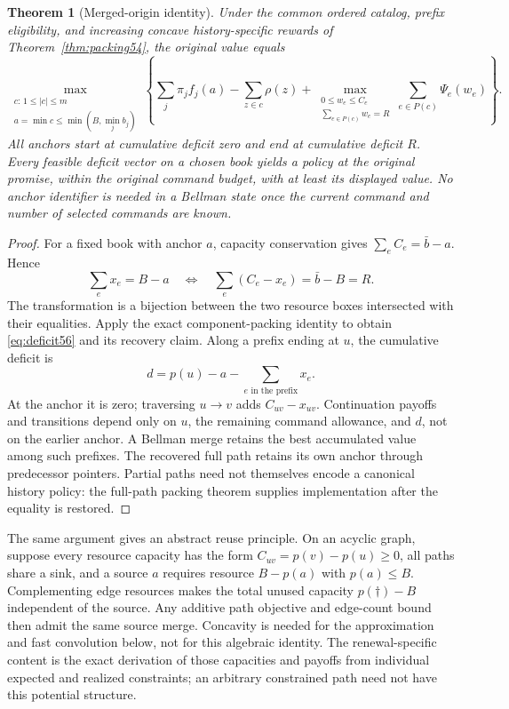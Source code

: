 \documentclass[11pt,letterpaper]{article}
\newtheorem{theorem}{Theorem}[section]
\theoremstyle{definition}\newtheorem{remark}[theorem]{Remark}
\begin{document}
\begin{theorem}[Merged-origin identity]\label{thm:deficit56}
Under the common ordered catalog, prefix eligibility, and increasing concave history-specific rewards of Theorem~\ref{thm:packing54}, the original value equals
\begin{equation}\label{eq:deficit56}
 \max_{\substack{c:\,1\leq |c|\leq m\\a=\min c\leq\min(B,\min_j b_j)}}
 \left\{\sum_j\pi_j f_j(a)-\sum_{z\in c}\rho(z)
 +\max_{\substack{0\leq w_e\leq C_e\\\sum_{e\in P(c)}w_e=R}}
           \sum_{e\in P(c)}\Psi_e(w_e)\right\}.
\end{equation}
All anchors start at cumulative deficit zero and end at cumulative deficit $R$. Every feasible deficit vector on a chosen book yields a policy at the original promise, within the original command budget, with at least its displayed value. No anchor identifier is needed in a Bellman state once the current command and number of selected commands are known.
\end{theorem}
\begin{proof}
For a fixed book with anchor $a$, capacity conservation gives $\sum_e C_e=\bar b-a$. Hence
\[
 \sum_e x_e=B-a\quad\Longleftrightarrow\quad
 \sum_e(C_e-x_e)=\bar b-B=R.
\]
The transformation is a bijection between the two resource boxes intersected with their equalities. Apply the exact component-packing identity to obtain \eqref{eq:deficit56} and its recovery claim. Along a prefix ending at $u$, the cumulative deficit is
\[
 d=p(u)-a-\sum_{e\text{ in the prefix}}x_e.
\]
At the anchor it is zero; traversing $u\to v$ adds $C_{uv}-x_{uv}$. Continuation payoffs and transitions depend only on $u$, the remaining command allowance, and $d$, not on the earlier anchor. A Bellman merge retains the best accumulated value among such prefixes. The recovered full path retains its own anchor through predecessor pointers. Partial paths need not themselves encode a canonical history policy: the full-path packing theorem supplies implementation after the equality is restored.
\end{proof}

The same argument gives an abstract reuse principle. On an acyclic graph, suppose every resource capacity has the form $C_{uv}=p(v)-p(u)\geq0$, all paths share a sink, and a source $a$ requires resource $B-p(a)$ with $p(a)\leq B$. Complementing edge resources makes the total unused capacity $p(\dagger)-B$ independent of the source. Any additive path objective and edge-count bound then admit the same source merge. Concavity is needed for the approximation and fast convolution below, not for this algebraic identity. The renewal-specific content is the exact derivation of those capacities and payoffs from individual expected and realized constraints; an arbitrary constrained path need not have this potential structure.
\end{document}
